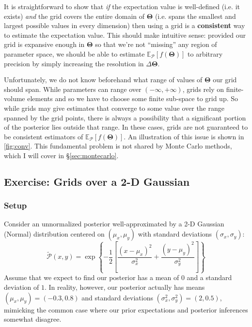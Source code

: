 \documentclass[12pt, titlepage]{article}
\newcommand{\meanwrt}[2]{\ensuremath{\mathbb{E}_{{#2}}\left[{#1}\right]}}
\newcommand{\params}{\ensuremath{\boldsymbol\Theta}}
\newcommand{\posterior}{\ensuremath{\mathcal{P}}}
\begin{document}
It is straightforward to show
that \textit{if} the expectation value is well-defined (i.e. it exists)
\textit{and} the grid covers the entire domain of $\params$ (i.e. spans
the smallest and largest possible values in every dimension)
then using a grid is a \textbf{consistent} way to estimate 
the expectation value.
This should make intuitive sense: provided our grid is
expansive enough in $\params$ so that we're not ``missing''
any region of parameter space, we should be able to estimate
$\meanwrt{f(\params)}{\posterior}$ to arbitrary precision
by simply increasing the resolution in $\Delta \params$.

Unfortunately, we do not know beforehand what range of 
values of $\params$ our grid should span. While parameters
can range over $(-\infty, +\infty)$, grids rely on finite-volume elements
and so we have to choose some finite sub-space to grid up.
So while grids may give estimates that converge to some
value over the range spanned by the grid points,
there is always a possibility that a significant portion of the posterior
lies outside that range. In these cases,
grids are not guaranteed to be consistent estimators
of $\meanwrt{f(\params)}{\posterior}$. An illustration of this issue is
shown in {\color{red} \autoref{fig:conv}}.
This fundamental problem is not shared by Monte Carlo
methods, which I will cover in \S\ref{sec:montecarlo}.

\subsection*{Exercise: Grids over a 2-D Gaussian} \label{exercise:grids}

\subsubsection*{Setup}

Consider an unnormalized posterior 
well-approximated by a 2-D Gaussian (Normal)
distribution centered on $(\mu_x,\mu_y)$ 
with standard deviations $(\sigma_x, \sigma_y)$:
\begin{equation*}
    \tilde{\posterior}(x,y) 
    = \exp\left\{-\frac{1}{2}\left[\frac{(x-\mu_x)^2}{\sigma_x^2}
    + \frac{(y-\mu_y)^2}{\sigma_y^2}\right]\right\}
\end{equation*}
Assume that we expect to find our posterior has a mean of $0$ and
a standard deviation of $1$.
In reality, however, our posterior actually has means $(\mu_x,\mu_y)=(-0.3,0.8)$ and
standard deviations $(\sigma_x^2,\sigma_y^2)=(2,0.5)$, mimicking the common
case where our prior expectations and posterior inferences somewhat disagree.
\end{document}
